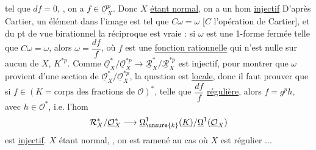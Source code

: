 tel que $df=0$, , on a
$f\in\underline{\mathcal O}_X^p$.
Donc $X$ \uline{étant normal}, on a un hom \uline{injectif}
D'après Cartier, un élément dans l'image est tel que
$C\omega=\omega$ [$C$ l'opération de Cartier], et du pt de
vue birationnel la réciproque est vraie : si $\omega$ est une
1-forme fermée telle que $C\omega=\omega$, alors $\omega=\dfrac{df}{f}$,
où $f$ est une \uline{fonction rationnelle} qui n'est nulle
sur aucun  de $X$,
 $K^{*p}$.
Comme $\underline{\mathcal O}_X^*/\underline{\mathcal O}_X^{*p}\longrightarrow
\underline{\mathcal R}_X^*/\underline{\mathcal R}_X^{*p}$ est injectif,
pour montrer que $\omega$ provient d'une section de
$\underline{\mathcal O}_X^*/\underline{\mathcal O}_X^{*p}$, la question est \uline{locale},
donc il faut prouver que si $f\in(K=\text{corps des fractions de }\mathcal O)^*$,
telle que $\dfrac{df}{f}$ \uline{régulière}, alors $f=g^p h$, avec $h\in\mathcal O^*$,
i.e.  l'hom
\[
\mathcal R_X^*/\underline{\mathcal O}_X^*\longrightarrow
\underline\Omega^1_{\unsure{k}}(\underline K)/\underline\Omega^1(\underline{\mathcal O}_X)
\]
est \uline{injectif}. $X$ étant normal, ,
on est ramené au cas où $X$ est  régulier ...
